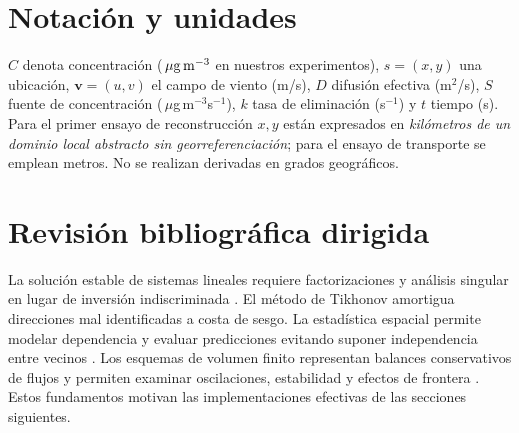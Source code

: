 \section{Notación y unidades}\label{sec:notacion}
$C$ denota concentración ($\,\mu\mathrm{g}\,\mathrm{m}^{-3}$ en nuestros experimentos), $s=(x,y)$ una ubicación, $\boldsymbol v=(u,v)$ el campo de viento (m/s), $D$ difusión efectiva (m$^2$/s), $S$ fuente de concentración (\,$\mu$g\,m$^{-3}$s$^{-1}$), $k$ tasa de eliminación (s$^{-1}$) y $t$ tiempo (s). Para el primer ensayo de reconstrucción $x,y$ están expresados en \emph{kilómetros de un dominio local abstracto sin georreferenciación}; para el ensayo de transporte se emplean metros. No se realizan derivadas en grados geográficos.

\section{Revisión bibliográfica dirigida}
La solución estable de sistemas lineales requiere factorizaciones y análisis singular en lugar de inversión indiscriminada \cite{golub2013}. El método de Tikhonov amortigua direcciones mal identificadas a costa de sesgo. La estadística espacial permite modelar dependencia y evaluar predicciones evitando suponer independencia entre vecinos \cite{cressie1993}. Los esquemas de volumen finito representan balances conservativos de flujos y permiten examinar oscilaciones, estabilidad y efectos de frontera \cite{leveque2002}. Estos fundamentos motivan las implementaciones efectivas de las secciones siguientes.
